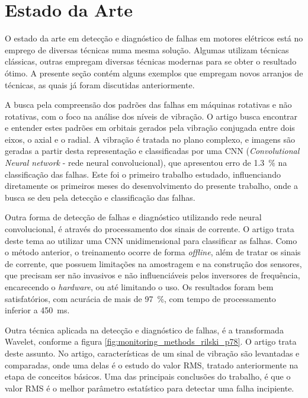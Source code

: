 % 

\section{Estado da Arte}

O estado da arte em detecção e diagnóstico de falhas em motores elétricos está no emprego de diversas técnicas numa mesma solução. Algumas 
utilizam técnicas clássicas, outras empregam diversas técnicas modernas para se obter o resultado ótimo. A presente seção contém
alguns exemplos que empregam novos arranjos de técnicas, as quais já foram discutidas anteriormente. 

A busca pela compreensão dos padrões das falhas em máquinas rotativas e não rotativas, com o foco na análise dos níveis de vibração. O artigo
\cite{Jeong2016} busca encontrar e entender estes padrões em orbitais gerados pela vibração conjugada entre dois eixos, o axial e o radial. A
vibração é tratada no plano complexo, e imagens são geradas a partir desta representação e classificadas por uma 
CNN (\textit{Convolutional Neural network} - rede neural convolucional), que apresentou erro de \SI{1.3}{\percent} na classificação das falhas.
Este foi o primeiro trabalho estudado, influenciando  diretamente os primeiros meses do desenvolvimento do presente trabalho, onde a busca se
deu pela detecção e classificação das falhas.

Outra forma de detecção de falhas e diagnóstico utilizando rede neural convolucional, é através do processamento dos sinais de corrente. O 
artigo \cite{Ince2016} trata deste tema ao utilizar uma CNN unidimensional para classificar as falhas. Como o método anterior, o treinamento
ocorre de forma \textit{offline}, além de tratar os sinais de corrente, que possuem limitações na amostragem e na construção dos sensores, que
precisam ser não invasivos e não influenciáveis pelos inversores de frequência, encarecendo o \textit{hardware}, ou até limitando o uso. Os
resultados foram bem satisfatórios, com acurácia de mais de \SI{97}{\percent}, com tempo de processamento inferior a \SI{450}{\milli\second}.

Outra técnica aplicada na detecção e diagnóstico de falhas, é a transformada Wavelet, conforme a figura \ref{fig:monitoring_methods_rilski_p78}.
O artigo \cite{Hemmati2016a} trata deste assunto. No artigo, características de um sinal de vibração são levantadas e comparadas,
onde uma delas é o estudo do valor RMS, tratado anteriormente na etapa de conceitos básicos. Uma das principais conclusões do trabalho, é que o 
valor RMS é o melhor parâmetro estatístico para detectar uma falha incipiente.

